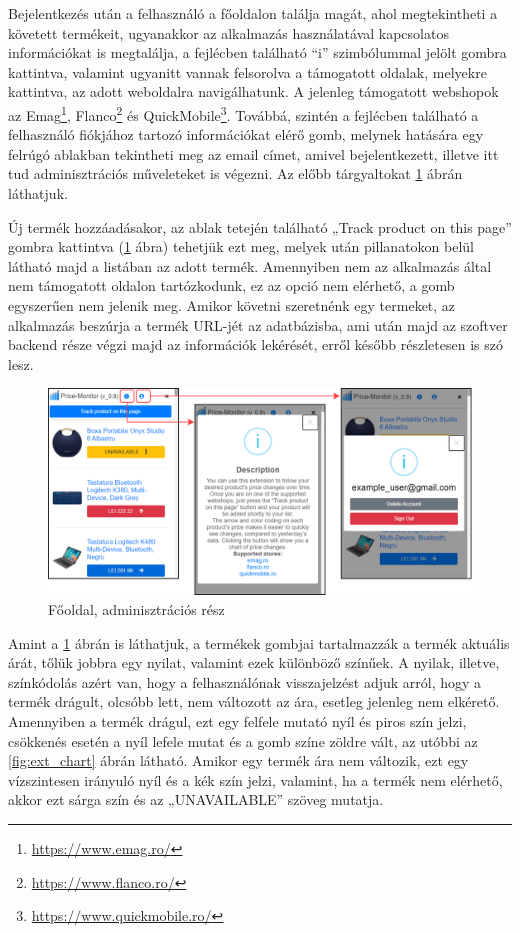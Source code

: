 Bejelentkezés után a felhasználó a főoldalon találja magát, ahol megtekintheti a követett termékeit, ugyanakkor az alkalmazás használatával kapcsolatos információkat is megtalálja, a fejlécben található “i” szimbólummal jelölt gombra kattintva, valamint ugyanitt vannak felsorolva a támogatott oldalak, melyekre kattintva, az adott weboldalra navigálhatunk. A jelenleg támogatott webshopok az Emag\footnote{\url{https://www.emag.ro/}}, Flanco\footnote{\url{https://www.flanco.ro/}} és QuickMobile\footnote{\url{https://www.quickmobile.ro/}}. Továbbá, szintén a fejlécben található a felhasználó fiókjához tartozó információkat elérő gomb, melynek hatására egy felrúgó ablakban tekintheti meg az email címet, amivel bejelentkezett, illetve itt tud adminisztrációs műveleteket is végezni. Az előbb tárgyaltokat \ref{fig:ext_homescreen_info_user} ábrán láthatjuk.

Új termék hozzáadásakor, az ablak tetején található „Track product on this page” gombra kattintva (\ref{fig:ext_homescreen_info_user} ábra) tehetjük ezt meg, melyek után pillanatokon belül látható majd a listában az adott termék. Amennyiben nem az alkalmazás által nem támogatott oldalon tartózkodunk, ez az opció nem elérhető, a gomb egyszerűen nem jelenik meg. Amikor követni szeretnénk egy termeket, az alkalmazás beszúrja a termék URL-jét az adatbázisba, ami után majd az szoftver backend része végzi majd az információk lekérését, erről később részletesen is szó lesz.

\begin{figure}[H]
    \centering
    \includegraphics[scale=1.15]{figures/images/home_info_user.png}
    \caption{Főoldal, adminisztrációs rész}
    \label{fig:ext_homescreen_info_user}
\end{figure}

Amint a \ref{fig:ext_homescreen_info_user} ábrán is láthatjuk, a termékek gombjai tartalmazzák a termék aktuális árát, tőlük jobbra egy nyilat, valamint ezek különböző színűek. A nyilak, illetve, színkódolás azért van, hogy a felhasználónak visszajelzést adjuk arról, hogy a termék drágult, olcsóbb lett, nem változott az ára, esetleg jelenleg nem elkérető. Amennyiben a termék drágul, ezt egy felfele mutató nyíl és piros szín jelzi, csökkenés esetén a nyíl lefele mutat és a gomb színe zöldre vált, az utóbbi az \ref{fig:ext_chart} ábrán látható. Amikor egy termék ára nem változik, ezt egy vízszintesen irányuló nyíl és a kék szín jelzi, valamint, ha a termék nem elérhető, akkor ezt sárga szín és az „UNAVAILABLE” szöveg mutatja.


